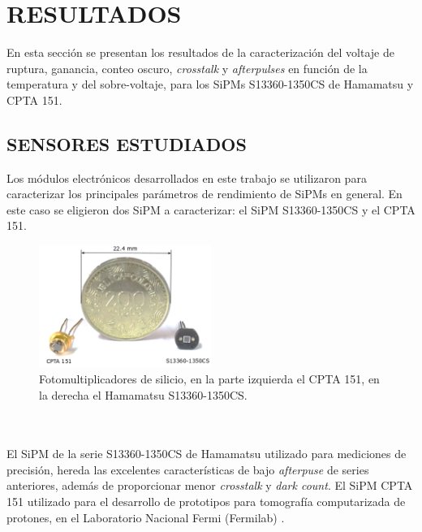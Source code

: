 \chapter{RESULTADOS}
En esta sección se presentan los resultados de la caracterización del voltaje de ruptura, ganancia, conteo oscuro, \textit{crosstalk} y \textit{afterpulses} en función de la temperatura y del sobre-voltaje, para los SiPMs S13360-1350CS de Hamamatsu y CPTA 151.   
\label{Cap:Caracterizacion}
\section{SENSORES ESTUDIADOS}
Los módulos electrónicos desarrollados en este trabajo se utilizaron para caracterizar los principales parámetros de rendimiento de SiPMs en general. En este caso se eligieron dos SiPM a caracterizar: el SiPM S13360-1350CS y el CPTA 151.
\begin{figure}[h!]
\begin{centering}
  \includegraphics[width=0.5\textwidth]{Images/SiPMs.PNG}
    \caption{Fotomultiplicadores de silicio, en la parte izquierda el CPTA 151, en la derecha el Hamamatsu S13360-1350CS.}%
    \label{fig:SiPMs}  
  \par\end{centering}
\end{figure}
\\ \\
El SiPM de la serie S13360-1350CS de Hamamatsu %
utilizado para mediciones de precisión, hereda las excelentes características de bajo \textit{afterpuse} de series anteriores, además de proporcionar menor \textit{crosstalk} y \textit{dark count}.
El SiPM CPTA 151 utilizado para el desarrollo de prototipos para tomografía computarizada de protones, en el Laboratorio Nacional Fermi (Fermilab) \citep{pCT_fermilab}.\\ \\%
